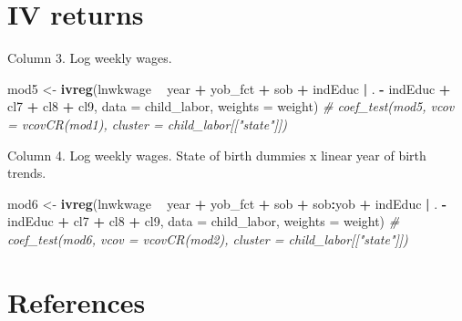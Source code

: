 \documentclass[]{book}
\newenvironment{Shaded}{\begin{snugshade}}{\end{snugshade}}
\newcommand{\CommentTok}[1]{\textcolor[rgb]{0.56,0.35,0.01}{\textit{#1}}}
\newcommand{\DataTypeTok}[1]{\textcolor[rgb]{0.13,0.29,0.53}{#1}}
\newcommand{\KeywordTok}[1]{\textcolor[rgb]{0.13,0.29,0.53}{\textbf{#1}}}
\newcommand{\NormalTok}[1]{#1}
\newcommand{\OperatorTok}[1]{\textcolor[rgb]{0.81,0.36,0.00}{\textbf{#1}}}
\newcommand{\StringTok}[1]{\textcolor[rgb]{0.31,0.60,0.02}{#1}}
\theoremstyle{definition}
\theoremstyle{definition}
\theoremstyle{definition}
\theoremstyle{remark}
\begin{document}
\hypertarget{iv-returns}{%
\section{IV returns}\label{iv-returns}}

Column 3. Log weekly wages.

\begin{Shaded}
\begin{Highlighting}[]
\NormalTok{mod5 <-}\StringTok{ }\KeywordTok{ivreg}\NormalTok{(lnwkwage }\OperatorTok{~}\StringTok{ }\NormalTok{year }\OperatorTok{+}\StringTok{ }\NormalTok{yob_fct }\OperatorTok{+}\StringTok{ }\NormalTok{sob }\OperatorTok{+}\StringTok{ }\NormalTok{indEduc }\OperatorTok{|}
\StringTok{               }\NormalTok{. }\OperatorTok{-}\StringTok{ }\NormalTok{indEduc }\OperatorTok{+}\StringTok{ }\NormalTok{cl7 }\OperatorTok{+}\StringTok{ }\NormalTok{cl8 }\OperatorTok{+}\StringTok{ }\NormalTok{cl9,}
              \DataTypeTok{data =}\NormalTok{ child_labor, }\DataTypeTok{weights =}\NormalTok{ weight)}
\CommentTok{# coef_test(mod5, vcov = vcovCR(mod1), cluster = child_labor[["state"]])}
\end{Highlighting}
\end{Shaded}

Column 4. Log weekly wages. State of birth dummies x linear year of
birth trends.

\begin{Shaded}
\begin{Highlighting}[]
\NormalTok{mod6 <-}\StringTok{ }\KeywordTok{ivreg}\NormalTok{(lnwkwage }\OperatorTok{~}\StringTok{ }\NormalTok{year }\OperatorTok{+}\StringTok{ }\NormalTok{yob_fct }\OperatorTok{+}\StringTok{ }\NormalTok{sob }\OperatorTok{+}\StringTok{ }\NormalTok{sob}\OperatorTok{:}\NormalTok{yob }\OperatorTok{+}\StringTok{ }\NormalTok{indEduc }\OperatorTok{|}
\StringTok{               }\NormalTok{. }\OperatorTok{-}\StringTok{ }\NormalTok{indEduc }\OperatorTok{+}\StringTok{ }\NormalTok{cl7 }\OperatorTok{+}\StringTok{ }\NormalTok{cl8 }\OperatorTok{+}\StringTok{ }\NormalTok{cl9,}
              \DataTypeTok{data =}\NormalTok{ child_labor, }\DataTypeTok{weights =}\NormalTok{ weight)}
\CommentTok{# coef_test(mod6, vcov = vcovCR(mod2), cluster = child_labor[["state"]])}
\end{Highlighting}
\end{Shaded}

\hypertarget{references-7}{%
\section*{References}\label{references-7}}
\end{document}
